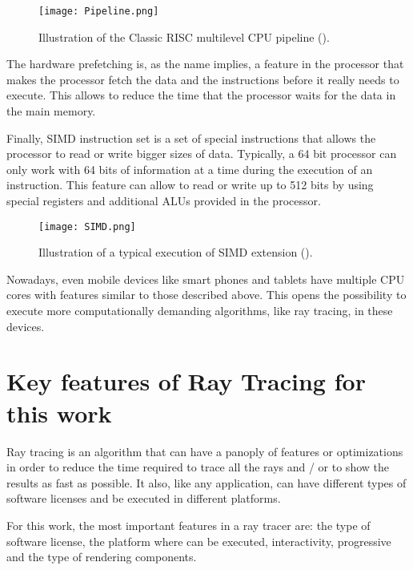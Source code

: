 \begin{figure}[H]
	\centering
	\caption{Illustration of the Classic RISC multilevel CPU pipeline (\cite{CPU_Pipeline}).}
	\label{Pipeline.}
	\texttt{[image: Pipeline.png]}
\end{figure}

\par
The hardware prefetching is, as the name implies, a feature in the processor that makes the processor fetch the data and the instructions before it really needs to execute.
This allows to reduce the time that the processor waits for the data in the main memory.

\par
Finally, SIMD instruction set is a set of special instructions that allows the processor to read or write bigger sizes of data.
Typically, a 64 bit processor can only work with 64 bits of information at a time during the execution of an instruction.
This feature can allow to read or write up to 512 bits by using special registers and additional ALUs provided in the processor.

\begin{figure}[H]
	\centering
	\caption{Illustration of a typical execution of SIMD extension (\cite{CPU_SIMD}).}
	\label{SIMD.}
	\texttt{[image: SIMD.png]}
\end{figure}

\par
Nowadays, even mobile devices like smart phones and tablets have multiple CPU cores with features similar to those described above.
This opens the possibility to execute more computationally demanding algorithms, like ray tracing, in these devices.

\section{Key features of Ray Tracing for this work}

\par
Ray tracing is an algorithm that can have a panoply of features or optimizations in order to reduce the time required to trace all the rays and / or to show the results as fast as possible.
It also, like any application, can have different types of software licenses and be executed in different platforms.

\par
For this work, the most important features in a ray tracer are: the type of software license, the platform where can be executed, interactivity, progressive and the type of rendering components.

